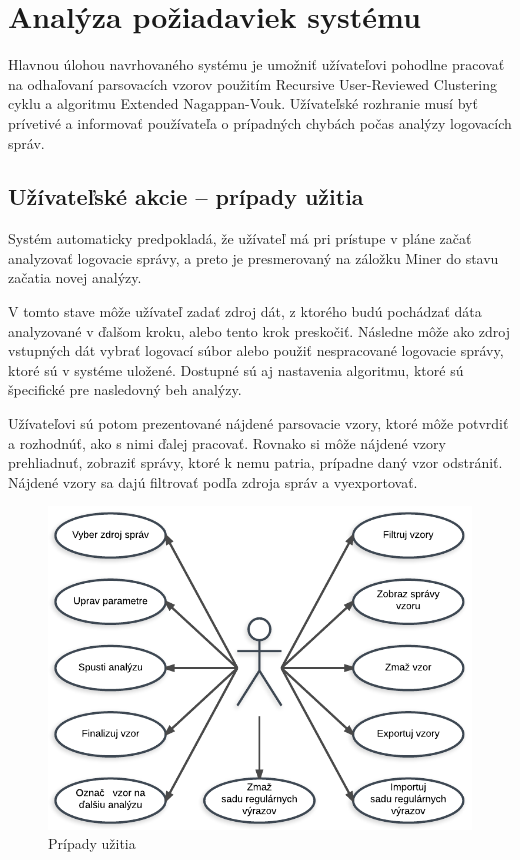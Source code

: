 \chapter{Analýza požiadaviek systému}

Hlavnou úlohou navrhovaného systému je umožniť užívateľovi pohodlne pracovať na odhaľovaní parsovacích vzorov použitím Recursive User-Reviewed Clustering cyklu a algoritmu Extended Nagappan-Vouk. Užívateľské rozhranie musí byť prívetivé a informovať používateľa o prípadných chybách počas analýzy logovacích správ.

\section{Užívateľské akcie -- prípady užitia}

Systém automaticky predpokladá, že užívateľ má pri prístupe v pláne začať analyzovať logovacie správy, a preto je presmerovaný na záložku Miner do stavu začatia novej analýzy. 
\par V tomto stave môže užívateľ zadať zdroj dát, z ktorého budú pochádzať dáta analyzované v ďalšom kroku, alebo tento krok preskočiť. Následne môže ako zdroj vstupných dát vybrať logovací súbor alebo použiť nespracované logovacie správy, ktoré sú v systéme uložené. Dostupné sú aj nastavenia algoritmu, ktoré sú špecifické pre nasledovný beh analýzy. \par Užívateľovi sú potom prezentované nájdené parsovacie vzory, ktoré môže potvrdiť a rozhodnúť, ako s nimi ďalej pracovať. Rovnako si môže nájdené vzory prehliadnuť, zobraziť správy, ktoré k nemu patria, prípadne daný vzor odstrániť. Nájdené vzory sa dajú filtrovať podľa zdroja správ a vyexportovať.

\begin{figure}[htbp]
 \centering 
 \begin{minipage}{0.95\linewidth}
 	\centering
 	\includegraphics[width=\textwidth]{Images/thesis-use-cases.pdf}	
 \end{minipage}
  \caption{Prípady užitia}
  \label{fig:use-cases}
\end{figure}

